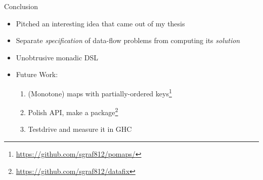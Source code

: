 \documentclass{haskellbeamer}
\begin{document}
\begin{frame}{Conclusion}
  \begin{itemize}
    \item Pitched an interesting idea that came out of my thesis
    \item Separate \emph{specification} of data-flow problems from computing its \emph{solution}
    \item Unobtrusive monadic DSL
    \item Future Work:
      \begin{enumerate}
        \item (Monotone) maps with partially-ordered keys\footnote{\tiny\url{https://github.com/sgraf812/pomaps/}}
        \item Polish API, make a package\footnote{\tiny\url{https://github.com/sgraf812/datafix}}
        \item Testdrive and measure it in GHC
      \end{enumerate}
  \end{itemize}
\end{frame}
\end{document}
